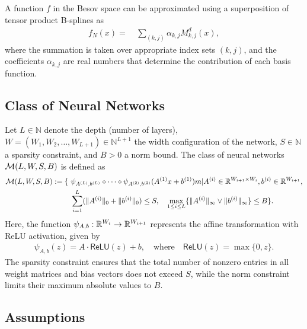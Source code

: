 \begin{definition}\label{def:approx_b_spline}
A function $f$ in the Besov space can be approximated using a superposition of tensor product B-splines as
\begin{align*}
    f_N(x) =&~ \sum_{(k,j)} \alpha_{k,j}  M_{k,j}^d(x),
\end{align*}
where the summation is taken over appropriate index sets $(k,j)$, and the coefficients $\alpha_{k,j}$ are real numbers that determine the contribution of each basis function.
\end{definition}

\subsection{Class of Neural Networks}
\begin{definition}\label{def:sparse_nn_class}
\label{def:nn_class}
Let $L \in \mathbb{N}$ denote the depth (number of layers), $W = (W_1, W_2, \dots, W_{L+1}) \in \mathbb{N}^{L+1}$ the width configuration of the network, $S \in \mathbb{N}$ a sparsity constraint, and $B > 0$ a norm bound. The class of neural networks ${\cal M}(L,W,S,B)$ is defined as
\begin{align*}
    {\cal M}(L,W,S,B) := 
     \{ &~
    \psi_{A^{(L)},b^{(L)}} 
    \circ \cdots \circ 
    \psi_{A^{(2)},b^{(2)}} (A^{(1)}x + b^{(1)} ) 
    m|  
    A^{(i)} \in \mathbb{R}^{W_{i+1} \times W_i}, 
    b^{(i)} \in \mathbb{R}^{W_{i+1}}, \\ 
    &~
    \sum_{i=1}^{L}  (\|A^{(i)}\|_0 + \|b^{(i)}\|_0 ) \leq S, 
    \quad 
    \max_{1 \leq i \leq L}  \{\|A^{(i)}\|_\infty \vee \|b^{(i)}\|_\infty \} \leq B
     \}.
\end{align*}
Here, the function $\psi_{A,b}: \mathbb{R}^{W_i} \to \mathbb{R}^{W_{i+1}}$ represents the affine transformation with ReLU activation, given by
\begin{align*}
    \psi_{A,b}(z) = A \cdot \mathsf{ReLU}(z) + b, \quad \mathrm{where} \quad \mathsf{ReLU}(z) = \max\{0, z\}.
\end{align*}
The sparsity constraint ensures that the total number of nonzero entries in all weight matrices and bias vectors does not exceed $S$, while the norm constraint limits their maximum absolute values to $B$.
\end{definition}

\subsection{Assumptions}

